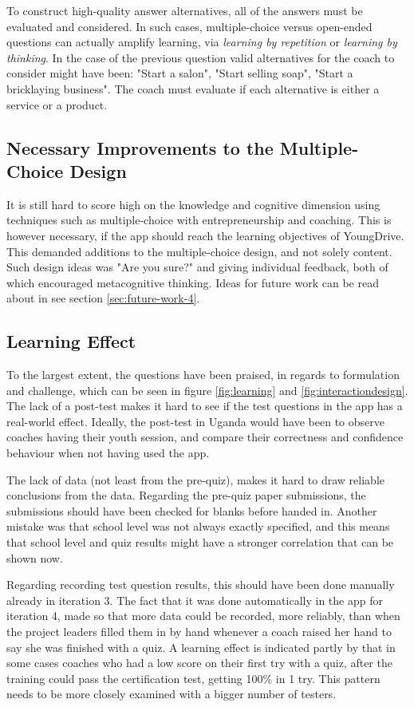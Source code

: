   To construct high-quality answer alternatives, all of the answers must be evaluated and considered. In such cases, multiple-choice versus open-ended questions can actually amplify learning, via \textit{learning by repetition} or \textit{learning by thinking}. In the case of the previous question valid alternatives for the coach to consider might have been: "Start a salon", "Start selling soap", "Start a bricklaying business". The coach must evaluate if each alternative is either a service or a product.

  \subsection{Necessary Improvements to the Multiple-Choice Design}
  It is still hard to score high on the knowledge and cognitive dimension using techniques such as multiple-choice with entrepreneurship and coaching. This is however necessary, if the app should reach the learning objectives of YoungDrive. This demanded additions to the multiple-choice design, and not solely content. Such design ideas was "Are you sure?" and giving individual feedback, both of which encouraged metacognitive thinking. Ideas for future work can be read about in see section \ref{sec:future-work-4}.

  \subsection{Learning Effect}
  To the largest extent, the questions have been praised, in regards to formulation and challenge, which can be seen in figure \ref{fig:learning} and \ref{fig:interactiondesign}. The lack of a post-test makes it hard to see if the test questions in the app has a real-world effect. Ideally, the post-test in Uganda would have been to observe coaches having their youth session, and compare their correctness and confidence behaviour when not having used the app. %

  The lack of data (not least from the pre-quiz), makes it hard to draw reliable conclusions from the data. Regarding the pre-quiz paper submissions, the submissions should have been checked for blanks before handed in. Another mistake was that school level was not always exactly specified, and this means that school level and quiz results might have a stronger correlation that can be shown now.

  Regarding recording test question results, this should have been done manually already in iteration 3. The fact that it was done automatically in the app for iteration 4, made so that more data could be recorded, more reliably, than when the project leaders filled them in by hand whenever a coach raised her hand to say she was finished with a quiz. A learning effect is indicated partly by that in some cases coaches who had a low score on their first try with a quiz, after the training could pass the certification test, getting 100\% in 1 try. This pattern needs to be more closely examined with a bigger number of testers.
